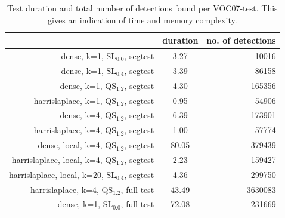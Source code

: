 \begin{table}[hbt]
    \centering
    \caption{Test duration and total number of detections found per VOC07-test. This gives an indication of time and memory complexity.}
    \label{tab:vocalldurdet}
    \begin{tabular}{rcr}
    ~&duration&no. of detections\\
    \hline
    dense, k=1, SL$_{0.0}$, segtest&3.27&10016\\
    dense, k=1, SL$_{0.4}$, segtest&3.39&86158\\
    dense, k=1, QS$_{1.2}$, segtest&4.30&165356\\
    harrislaplace, k=1, QS$_{1.2}$, segtest&0.95&54906\\
    dense, k=4, QS$_{1.2}$, segtest&6.39&173901\\
    harrislaplace, k=4, QS$_{1.2}$, segtest&1.00&57774\\
    dense, local, k=4, QS$_{1.2}$, segtest&80.05&379439\\
    harrislaplace, local, k=4, QS$_{1.2}$, segtest&2.23&159427\\
    harrislaplace, local, k=20, SL$_{0.4}$, segtest&4.36&299750\\
    harrislaplace, k=4, QS$_{1.2}$, full test&43.49&3630083\\
    dense, k=1, SL$_{0.0}$, full test&72.08&231669
    \end{tabular}
\end{table}


